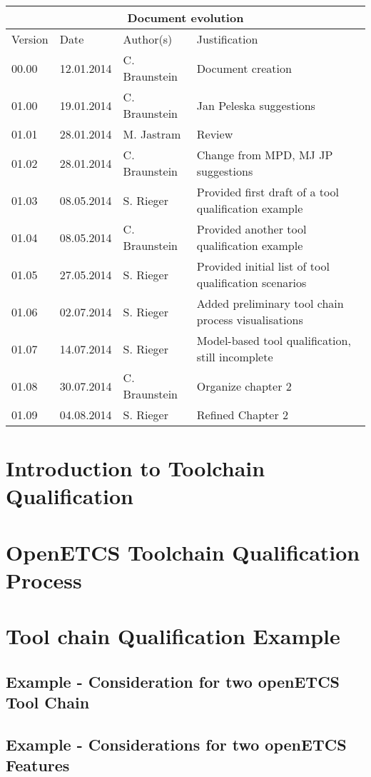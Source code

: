 \documentclass{openetcs_report}
\begin{document}
\begin{tabular}{|p{2.2cm}|p{2cm}|p{3cm}|p{5cm}|}
\hline
\multicolumn{4}{|c|}{Document evolution} \\
\hline
Version &  Date & Author(s) & Justification  \\
\hline  
00.00 & 12.01.2014 & C. Braunstein  &  Document creation  \\
01.00 & 19.01.2014 & C. Braunstein  &  Jan Peleska suggestions \\
01.01 & 28.01.2014 & M. Jastram  &  Review \\
01.02 & 28.01.2014 &  C. Braunstein &  Change from MPD, MJ JP suggestions \\
01.03 & 08.05.2014 &  S. Rieger &  Provided first draft of a tool qualification example \\
01.04 & 08.05.2014 &  C. Braunstein  &  Provided  another  tool qualification example \\
01.05 & 27.05.2014 &  S. Rieger &  Provided initial list of tool qualification scenarios\\
01.06 & 02.07.2014 &  S. Rieger &  Added preliminary tool chain process visualisations\\
01.07 & 14.07.2014 &  S. Rieger &  Model-based tool qualification,
still incomplete\\
01.08 & 30.07.2014 & C. Braunstein & Organize chapter 2 \\
01.09 & 04.08.2014 & S. Rieger & Refined Chapter 2 \\
\hline  
\end{tabular}
\newpage


\mainmatter







\chapter{Introduction to Toolchain Qualification}
\label{chap:introduction-and-sota}




\chapter{OpenETCS Toolchain Qualification Process}
\label{chap:qualification-process}


\chapter{Tool chain Qualification Example}
\section{Example - Consideration for two openETCS Tool Chain}

\section{Example - Considerations for two openETCS Features}
\label{chap:examples}




\end{document}
